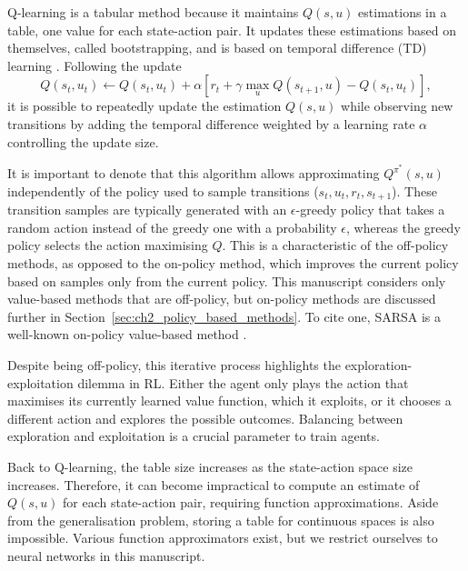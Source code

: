 Q-learning is a tabular method because it maintains $Q(s, u)$ estimations in a table, one value for each state-action pair.
It updates these estimations based on themselves, called bootstrapping, and is based on temporal difference (TD) learning \citep{sutton2018reinforcement}.
Following the update 
\begin{equation}
\label{eq:ch2_QLearning}
    Q(s_t, u_t) \leftarrow Q(s_t, u_t) + \alpha \left[ r_t + \gamma \max_u Q(s_{t+1}, u) - Q(s_t, u_t) \right],
\end{equation}
it is possible to repeatedly update the estimation $Q(s, u)$ while observing new transitions by adding the temporal difference weighted by a learning rate $\alpha$ controlling the update size.

It is important to denote that this algorithm allows approximating $Q^{\pi^*}(s, u)$ independently of the policy used to sample transitions ($s_t, u_t, r_t, s_{t+1}$).
These transition samples are typically generated with an $\epsilon$-greedy policy that takes a random action instead of the greedy one with a probability $\epsilon$, whereas the greedy policy selects the action maximising $Q$.
This is a characteristic of the off-policy methods, as opposed to the on-policy method, which improves the current policy based on samples only from the current policy.
This manuscript considers only value-based methods that are off-policy, but on-policy methods are discussed further in Section~\ref{sec:ch2_policy_based_methods}.
To cite one, SARSA is a well-known on-policy value-based method \citep{sutton2018reinforcement}.

Despite being off-policy, this iterative process highlights the exploration-exploitation dilemma in RL.
Either the agent only plays the action that maximises its currently learned value function, which it exploits, or it chooses a different action and explores the possible outcomes.
Balancing between exploration and exploitation is a crucial parameter to train agents.

Back to Q-learning, the table size increases as the state-action space size increases.
Therefore, it can become impractical to compute an estimate of $Q(s, u)$ for each state-action pair, requiring function approximations.
Aside from the generalisation problem, storing a table for continuous spaces is also impossible.
Various function approximators exist, but we restrict ourselves to neural networks in this manuscript.

